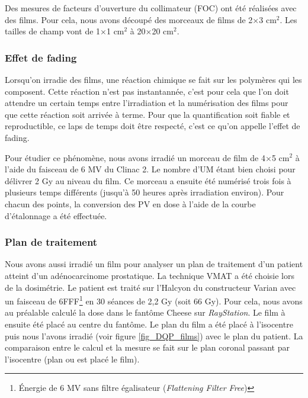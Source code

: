 \documentclass{book}
\begin{document}
Des mesures de facteurs d'ouverture du collimateur (FOC) ont été réalisées avec des films. Pour cela, nous avons découpé des morceaux de films de 2$\times$3 cm$^2$. Les tailles de champ vont de 1$\times$1 cm$^2$ à 20$\times$20 cm$^2$.

\subsubsection{Effet de fading}

Lorsqu'on irradie des films, une réaction chimique se fait sur les polymères qui les composent. Cette réaction n'est pas instantannée, c'est pour cela que l'on doit attendre un certain temps entre l'irradiation et la numérisation des films pour que cette réaction soit arrivée à terme. Pour que la quantification soit fiable et reproductible, ce laps de temps doit être respecté, c'est ce qu'on appelle l'effet de fading.

Pour étudier ce phénomène, nous avons irradié un morceau de film de 4$\times$5 cm$^2$ à l'aide du faisceau de 6 MV du Clinac 2. Le nombre d'UM étant bien choisi pour délivrer 2 Gy au niveau du film. Ce morceau a ensuite été numérisé trois fois à plusieurs temps différents (jusqu'à 50 heures après irradiation environ). Pour chacun des points, la conversion des PV en dose à l'aide de la courbe d'étalonnage a été effectuée. 

\subsubsection{Plan de traitement}

Nous avons aussi irradié un film pour analyser un plan de traitement d'un patient atteint d'un adénocarcinome prostatique. La technique VMAT a été choisie lors de la dosimétrie. Le patient est traité sur l'Halcyon du constructeur Varian avec un faisceau de 6FFF\footnote{Énergie de 6 MV sans filtre égalisateur (\textit{Flattening Filter Free})} en 30 séances de 2,2 Gy (soit 66 Gy). Pour cela, nous avons au préalable calculé la dose dans le fantôme Cheese sur \textit{RayStation}. Le film à ensuite été placé au centre du fantôme. Le plan du film a été placé à l'isocentre puis nous l'avons irradié (voir figure \ref*{fig_DQP_films}) avec le plan du patient. La comparaison entre le calcul et la mesure se fait sur le plan coronal passant par l'isocentre (plan ou est placé le film).
\end{document}
